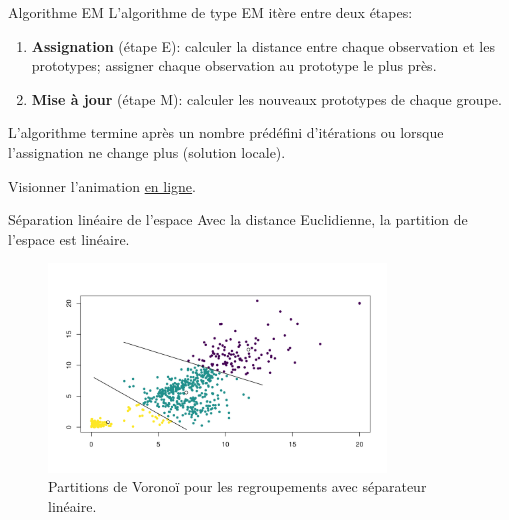 \documentclass[
  ignorenonframetext,
]{beamer}
\providecommand{\tightlist}{%
  \setlength{\itemsep}{0pt}\setlength{\parskip}{0pt}}\usepackage{longtable,booktabs,array}
\begin{document}
\begin{frame}{Algorithme EM}
\protect\hypertarget{algorithme-em}{}
L'algorithme de type EM itère entre deux étapes:

\begin{enumerate}
\tightlist
\item
  \textbf{Assignation} (étape E): calculer la distance entre chaque
  observation et les prototypes; assigner chaque observation au
  prototype le plus près.
\item
  \textbf{Mise à jour} (étape M): calculer les nouveaux prototypes de
  chaque groupe.
\end{enumerate}

L'algorithme termine après un nombre prédéfini d'itérations ou lorsque
l'assignation ne change plus (solution locale).

Visionner l'animation
\href{https://lbelzile.github.io/math60602/03-regroupements_files/figure-html/fig-kmoy-animation-.gif}{en
ligne}.
\end{frame}

\begin{frame}{Séparation linéaire de l'espace}
\protect\hypertarget{suxe9paration-linuxe9aire-de-lespace}{}
Avec la distance Euclidienne, la partition de l'espace est linéaire.

\begin{figure}

{\centering \includegraphics[width=0.8\textwidth,height=\textheight]{figures/fig-voronoikmoy.png}

}

\caption{\label{fig-voronoy}Partitions de Voronoï pour les regroupements
avec séparateur linéaire.}

\end{figure}
\end{frame}
\end{document}
